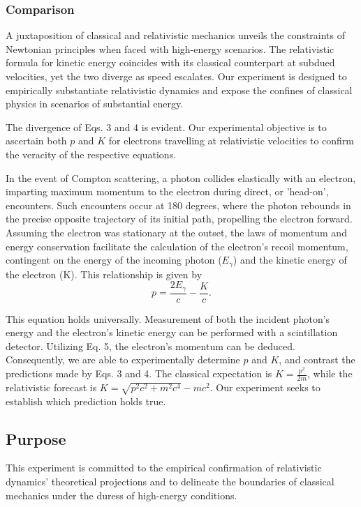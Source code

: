 \documentclass[12pt]{article}
\begin{document}
            \subsubsection{Comparison}
                    A juxtaposition of classical and relativistic mechanics unveils the constraints of Newtonian principles when faced with high-energy scenarios. The relativistic formula for kinetic energy coincides with its classical counterpart at subdued velocities, yet the two diverge as speed escalates. Our experiment is designed to empirically substantiate relativistic dynamics and expose the confines of classical physics in scenarios of substantial energy.

                    The divergence of Eqs. 3 and 4 is evident. Our experimental objective is to ascertain both \( p \) and \( K \) for electrons travelling at relativistic velocities to confirm the veracity of the respective equations.

                    In the event of Compton scattering, a photon collides elastically with an electron, imparting maximum momentum to the electron during direct, or 'head-on', encounters. Such encounters occur at 180 degrees, where the photon rebounds in the precise opposite trajectory of its initial path, propelling the electron forward. Assuming the electron was stationary at the outset, the laws of momentum and energy conservation facilitate the calculation of the electron's recoil momentum, contingent on the energy of the incoming photon (\( E_\gamma \)) and the kinetic energy of the electron (K). This relationship is given by
                    \begin{equation}
                    p = \frac{2E_\gamma}{c} - \frac{K}{c}.
                    \end{equation}

                    This equation holds universally. Measurement of both the incident photon's energy and the electron's kinetic energy can be performed with a scintillation detector. Utilizing Eq. 5, the electron's momentum can be deduced. Consequently, we are able to experimentally determine \( p \) and \( K \), and contrast the predictions made by Eqs. 3 and 4. The classical expectation is \( K = \frac{p^2}{2m} \), while the relativistic forecast is \( K = \sqrt{ p^2c^2 + m^2c^4 } - mc^2 \). Our experiment seeks to establish which prediction holds true.

    \subsection{Purpose}
            This experiment is committed to the empirical confirmation of relativistic dynamics' theoretical projections and to delineate the boundaries of classical mechanics under the duress of high-energy conditions.
\end{document}
